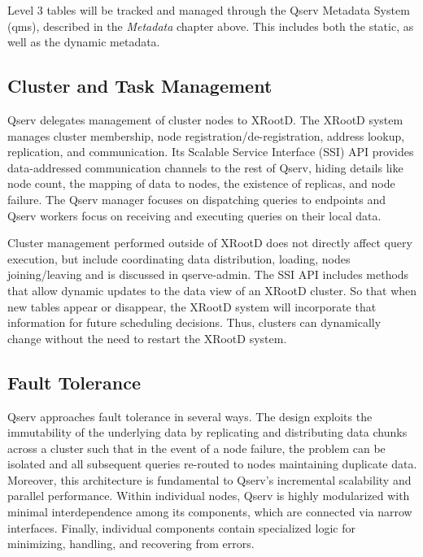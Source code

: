 \documentclass[DM,lsstdraft,toc]{lsstdoc}
\begin{document}
Level 3 tables will be tracked and managed through the Qserv Metadata
System (qms), described in the \emph{Metadata} chapter above. This
includes both the static, as well as the dynamic metadata.

\subsection{Cluster and Task
Management}\label{cluster-and-task-management}

Qserv delegates management of cluster nodes to
XRootD. The XRootD
system manages cluster membership, node registration/de-registration,
address lookup, replication, and communication. Its Scalable Service
Interface (SSI) API provides data-addressed communication
channels to the rest of Qserv, hiding details like node count, the
mapping of data to nodes, the existence of replicas, and node failure.
The Qserv manager focuses on dispatching queries to endpoints and Qserv
workers focus on receiving and executing queries on their local data.

Cluster management performed outside of XRootD
does not directly affect query execution, but include coordinating data
distribution, loading, nodes joining/leaving and is discussed in
qserve-admin. The SSI API includes methods that allow dynamic
updates to the data view of an XRootD cluster.
So that when new tables appear or disappear, the
XRootD system will incorporate that
information for future scheduling decisions. Thus, clusters can
dynamically change without the need to restart the
XRootD system.

\subsection{Fault Tolerance}\label{fault-tolerance}

Qserv approaches fault tolerance in several ways. The design exploits
the immutability of the underlying data by replicating and distributing
data chunks across a cluster such that in the event of a node failure,
the problem can be isolated and all subsequent queries re-routed to
nodes maintaining duplicate data. Moreover, this architecture is
fundamental to Qserv's incremental scalability and parallel performance.
Within individual nodes, Qserv is highly modularized with minimal
interdependence among its components, which are connected via narrow
interfaces. Finally, individual components contain specialized logic for
minimizing, handling, and recovering from errors.
\end{document}
